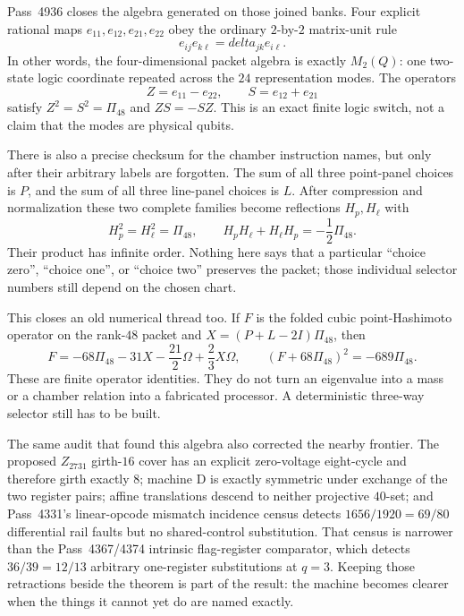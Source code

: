 \documentclass[11pt]{article}
\def\mathbb#1{#1}%
\def\delta{delta}%
\begin{document}
Pass~4936 closes the algebra generated on those joined banks.  Four explicit
rational maps $e_{11},e_{12},e_{21},e_{22}$ obey the ordinary $2$-by-$2$
matrix-unit rule
\[
 e_{ij}e_{k\ell}=\delta_{jk}e_{i\ell}.
\]
In other words, the four-dimensional packet algebra is exactly
$M_2(\mathbb Q)$: one two-state logic coordinate repeated across the $24$
representation modes.  The operators
\[
 Z=e_{11}-e_{22},\qquad S=e_{12}+e_{21}
\]
satisfy $Z^2=S^2=\Pi_{48}$ and $ZS=-SZ$.  This is an exact finite logic
switch, not a claim that the modes are physical qubits.

There is also a precise checksum for the chamber instruction names, but only
after their arbitrary labels are forgotten.  The sum of all three point-panel
choices is $P$, and the sum of all three line-panel choices is $L$.  After
compression and normalization these two complete families become reflections
$H_p,H_\ell$ with
\[
 H_p^2=H_\ell^2=\Pi_{48},\qquad
 H_pH_\ell+H_\ell H_p=-\frac12\Pi_{48}.
\]
Their product has infinite order.  Nothing here says that a particular
``choice zero'', ``choice one'', or ``choice two'' preserves the packet; those
individual selector numbers still depend on the chosen chart.

This closes an old numerical thread too. If $F$ is the folded cubic
point-Hashimoto operator on the rank-$48$ packet and
$X=(P+L-2I)\Pi_{48}$, then
\[
 F=-68\Pi_{48}-31X-\frac{21}{2}\Omega+\frac23X\Omega,
 \qquad (F+68\Pi_{48})^2=-689\Pi_{48}.
\]
These are finite operator identities. They do not turn an eigenvalue into a
mass or a chamber relation into a fabricated processor. A deterministic
three-way selector still has to be built.

The same audit that found this algebra also corrected the nearby frontier.
The proposed $\mathbb Z_{2731}$ girth-$16$ cover has an explicit zero-voltage
eight-cycle and therefore girth exactly $8$; machine D is exactly symmetric
under exchange of the two register pairs; affine translations descend to
neither projective $40$-set; and Pass~4331's linear-opcode mismatch incidence
census detects $1656/1920=69/80$ differential rail faults but no shared-control
substitution. That census is narrower than the Pass~4367/4374 intrinsic
flag-register comparator, which detects $36/39=12/13$ arbitrary one-register
substitutions at $q=3$.
Keeping those retractions beside the theorem is part of the result: the
machine becomes clearer when the things it cannot yet do are named exactly.
\end{document}
